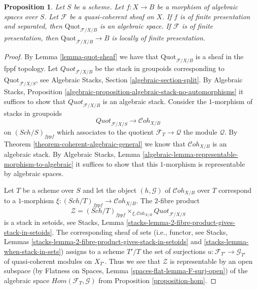 \documentclass{stacks-project}
\theoremstyle{plain}
\newtheorem{proposition}[subsection]{Proposition}
\theoremstyle{definition}
\theoremstyle{remark}
\numberwithin{equation}{subsection}
\def\Sch{\mathit{Sch}}
\def\Cohstack{\mathcal{C}\!\mathit{oh}}
\def\Quotfunctor{\mathrm{Quot}}
\begin{document}
\begin{proposition}
\label{proposition-quot}
Let $S$ be a scheme. Let $f : X \to B$ be a morphism of algebraic
spaces over $S$. Let $\mathcal{F}$ be a quasi-coherent sheaf
on $X$. If $f$ is of finite presentation and separated, then
$\Quotfunctor_{\mathcal{F}/X/B}$
is an algebraic space. If $\mathcal{F}$ is of finite presentation,
then $\Quotfunctor_{\mathcal{F}/X/B} \to B$ is locally of finite presentation.
\end{proposition}

\begin{proof}
By Lemma \ref{lemma-quot-sheaf}
we have that $\Quotfunctor_{\mathcal{F}/X/B}$ is a sheaf in the
fppf topology. Let $\textit{Quot}_{\mathcal{F}/X/B}$ be the stack in
groupoids corresponding to $\Quotfunctor_{\mathcal{F}/X/S}$, see
Algebraic Stacks, Section \ref{algebraic-section-split}.
By Algebraic Stacks, Proposition
\ref{algebraic-proposition-algebraic-stack-no-automorphisms}
it suffices to show that $\textit{Quot}_{\mathcal{F}/X/B}$
is an algebraic stack.
Consider the $1$-morphism of stacks in groupoids
$$
\textit{Quot}_{\mathcal{F}/X/S}
\longrightarrow
\Cohstack_{X/B}
$$
on $(\Sch/S)_{fppf}$ which associates to the quotient
$\mathcal{F}_T \to \mathcal{Q}$ the module $\mathcal{Q}$.
By Theorem \ref{theorem-coherent-algebraic-general} we know that
$\Cohstack_{X/B}$ is an algebraic stack.
By Algebraic Stacks, Lemma
\ref{algebraic-lemma-representable-morphism-to-algebraic}
it suffices to show that this $1$-morphism is representable
by algebraic spaces.

\medskip\noindent
Let $T$ be a scheme over $S$ and let the object $(h, \mathcal{G})$ of
$\Cohstack_{X/B}$ over $T$ correspond
to a $1$-morphism $\xi : (\Sch/T)_{fppf} \to \Cohstack_{X/B}$.
The $2$-fibre product
$$
\mathcal{Z} =
(\Sch/T)_{fppf}
\times_{\xi, \Cohstack_{X/B}}
\textit{Quot}_{\mathcal{F}/X/S}
$$
is a stack in setoids, see
Stacks, Lemma \ref{stacks-lemma-2-fibre-product-gives-stack-in-setoids}.
The corresponding sheaf of sets (i.e., functor, see
Stacks, Lemmas
\ref{stacks-lemma-2-fibre-product-gives-stack-in-setoids} and
\ref{stacks-lemma-when-stack-in-sets}) assigns to a scheme
$T'/T$ the set of surjections $u : \mathcal{F}_{T'} \to \mathcal{G}_{T'}$
of quasi-coherent modules on $X_{T'}$. Thus we see that
$\mathcal{Z}$ is representable by an open subspace
(by Flatness on Spaces, Lemma \ref{spaces-flat-lemma-F-surj-open})
of the algebraic space
$\mathit{Hom}(\mathcal{F}_T, \mathcal{G})$ from
Proposition \ref{proposition-hom}.
\end{proof}
\end{document}

